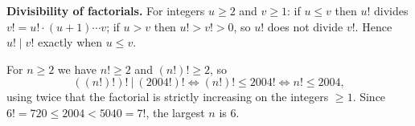 \textbf{Divisibility of factorials.} For integers $u\ge2$ and $v\ge1$: if $u\le v$ then $u!$ divides $v!=u!\cdot(u+1)\cdots v$; if $u>v$ then $u!>v!>0$, so $u!$ does not divide $v!$. Hence $u!\mid v!$ exactly when $u\le v$.

For $n\ge2$ we have $n!\ge2$ and $(n!)!\ge2$, so
\[((n!)!)!\ \Big|\ (2004!)!\iff(n!)!\le2004!\iff n!\le2004,\]
using twice that the factorial is strictly increasing on the integers $\ge1$. Since $6!=720\le2004<5040=7!$, the largest $n$ is $\boxed{6}$.
